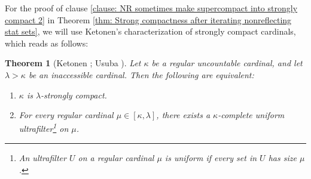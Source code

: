 \documentclass[11pt]{amsart}
\newtheorem{theorem}{Theorem}[section]
\theoremstyle{definition}
\theoremstyle{remark}
\newcommand\<{{<}}
\begin{document}
    For the proof of clause \eqref{clause: NR sometimes make supercompact into strongly compact 2} in Theorem \ref{thm: Strong compactness after iterating nonreflecting stat sets}, we will use Ketonen's characterization of strongly compact cardinals, which reads as follows:

    \begin{theorem}[{Ketonen \cite{Ketonen}; Usuba \cite[Lemmas 2.2 and 2.12]{usuba2021note}}]\label{thm: Ketonen's charachterization for strong compactness}
     Let $\kappa$ be a regular uncountable cardinal, and let $\lambda> \kappa$ be an inaccessible cardinal. Then the following are equivalent:
        \begin{enumerate}
            \item $\kappa$ is $\lambda$-strongly compact.
            \item For every regular cardinal $\mu \in [\kappa, \lambda]$, there exists a $\kappa$-complete uniform ultrafilter\footnote{An ultrafilter $U$ on a regular cardinal $\mu$ is uniform if every set in $U$ has size $\mu$.} on $\mu$.
        \end{enumerate}
    \end{theorem}
\end{document}
